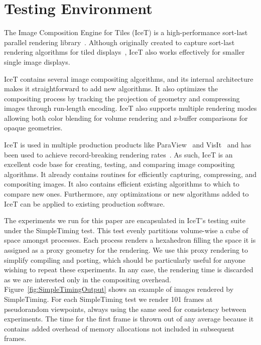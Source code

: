 \documentclass{vgtc}                          %
\newcommand*{\lcite}[1]{~\cite{#1}}
\begin{document}
\section{Testing Environment}
\label{sec:TestingEnvironment}

The Image Composition Engine for Tiles (IceT) is a high-performance
sort-last parallel rendering library\lcite{IceT}.  Although originally
created to capture sort-last rendering algorithms for tiled
displays\lcite{Moreland2001}, IceT also works effectively for smaller
single image displays.

IceT contains several image compositing algorithms, and its internal
architecture makes it straightforward to add new algorithms.  It also
optimizes the compositing process by tracking the projection of geometry
and compressing images through run-length encoding.  IceT also supports
multiple rendering modes allowing both color blending for volume rendering
and z-buffer comparisons for opaque geometries.

IceT is used in multiple production products like ParaView\lcite{ParaView}
and VisIt\lcite{VisIt} and has been used to achieve record-breaking
rendering rates\lcite{Higham2005}.  As such, IceT is an excellent code base
for creating, testing, and comparing image compositing algorithms.  It
already contains routines for efficiently capturing, compressing, and
compositing images.  It also contains efficient existing algorithms to
which to compare new ones.  Furthermore, any optimizations or new
algorithms added to IceT can be applied to existing production software.

The experiments we run for this paper are encapsulated in IceT's testing
suite under the SimpleTiming test.  This test evenly partitions volume-wise
a cube of space amongst processes.  Each process renders a hexahedron
filling the space it is assigned as a proxy geometry for the rendering.  We
use this proxy rendering to simplify compiling and porting, which should be
particularly useful for anyone wishing to repeat these experiments.  In any
case, the rendering time is discarded as we are interested only in the
compositing overhead.  Figure~\ref{fig:SimpleTimingOutput} shows an example
of images rendered by SimpleTiming.  For each SimpleTiming test we render
101 frames at pseudorandom viewpoints, always using the same seed for
consistency between experiments.  The time for the first frame is thrown
out of any average because it contains added overhead of memory allocations
not included in subsequent frames.
\end{document}
